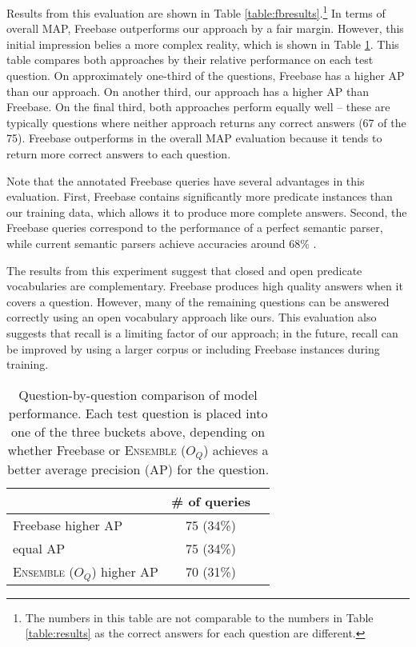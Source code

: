 \documentclass[11pt]{article}
\newcommand{\eqr}{\textsc{Ensemble} (\ensuremath{O_Q})}
\begin{document}
Results from this evaluation are shown in Table
\ref{table:fbresults}.\footnote{The numbers in this table are not
  comparable to the numbers in Table \ref{table:results} as the
  correct answers for each question are different.} In terms of
overall MAP, Freebase outperforms our approach by a fair
margin. However, this initial impression belies a more complex
reality, which is shown in Table \ref{table:fbresults2}. This table
compares both approaches by their relative performance on each test
question. On approximately one-third of the questions, Freebase has a
higher AP than our approach. On another third, our approach has a
higher AP than Freebase. On the final third, both approaches perform
equally well -- these are typically questions where neither approach
returns any correct answers (67 of the 75). Freebase outperforms in
the overall MAP evaluation because it tends to return more correct
answers to each question.

Note that the annotated Freebase queries have several advantages in
this evaluation. First, Freebase contains significantly more predicate
instances than our training data, which allows it to produce more
complete answers. Second, the Freebase queries correspond to the
performance of a perfect semantic parser, while current semantic
parsers achieve accuracies around 68\% \cite{berant2014}.

The results from this experiment suggest that closed and open
predicate vocabularies are complementary. Freebase produces high
quality answers when it covers a question. However, many of the
remaining questions can be answered correctly using an open vocabulary
approach like ours. This evaluation also suggests that recall is a
limiting factor of our approach; in the future, recall can be improved
by using a larger corpus or including Freebase instances during
training.

\begin{table}
\centering
{\small
\begin{tabular}{lcc} \toprule
 & \# of queries  \\ \midrule
Freebase higher AP & 75 (34\%)  \\
equal AP & 75 (34\%) \\
\eqr{} higher AP & 70 (31\%) \\ \bottomrule
\end{tabular}
}
\vspace{-.1in}
\caption{Question-by-question comparison of model performance. Each
  test question is placed into one of the three buckets above,
  depending on whether Freebase or \eqr{} achieves a better average
  precision (AP) for the question.}
\label{table:fbresults2}
\vspace{-.1in}
\end{table}
\end{document}
